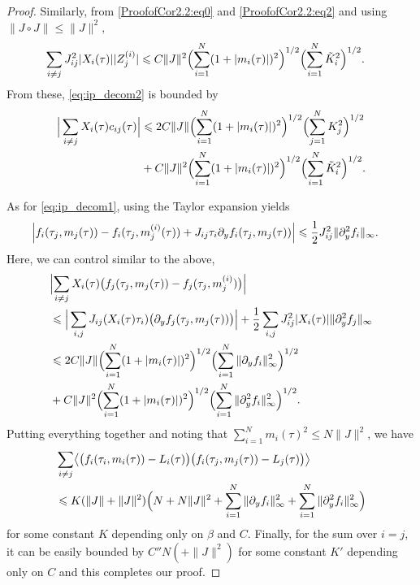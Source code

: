 \documentclass[letterpaper,11pt,reqno]{amsart}
\renewcommand{\le}{\leqslant}
\renewcommand{\leq}{\leqslant}
\newcommand{\ra}{\rangle}
\newcommand{\la}{\langle}
\newcommand{\mvgt}{{\tau}}
\begin{document}
\begin{proof}
Similarly, from \eqref{ProofofCor2.2:eq0} and \eqref{ProofofCor2.2:eq2} and using $\|J\circ J\|\leq \|J\|^2,$
\begin{align*}
     \sum_{i \ne j} J_{ij}^2|X_i(\tau)||Z_j^{(i)}|  
    &\leq C\|J\|^2\Bigl(\sum_{i=1}^N(1+|m_i(\tau)|)^2\Bigr)^{1/2}\Bigl(\sum_{i=1}^N\tilde K_i^2\Bigr)^{1/2}.
\end{align*}
From these, \eqref{eq:ip_decom2} is bounded by
\begin{align*}
  \Big| \sum_{i \ne j} X_i(\tau) c_{ij}(\tau) \Big |&\leq 2 C\|J\|\Bigl(\sum_{i=1}^N(1+|m_i(\tau)|)^2\Bigr)^{1/2}\Bigl(\sum_{j=1}^NK_j^2\Bigr)^{1/2}\\
&+C\|J\|^2\Bigl(\sum_{i=1}^N(1+|m_i(\tau)|)^2\Bigr)^{1/2}\Bigl(\sum_{i=1}^N\tilde K_i^2\Bigr)^{1/2}.
\end{align*}


As for \eqref{eq:ip_decom1}, using the Taylor expansion yields
\begin{align*}
    \Bigl|f_i(\tau_j,m_j(\mvgt))-f_i(\tau_j,m_j^{(i)}(\mvgt))+J_{ij}\tau_i\partial_yf_i(\tau_j, m_j(\mvgt))\Bigr|&\leq \frac{1}{2}J_{ij}^2\|\partial^2_{y}f_i\|_\infty.
\end{align*}
Here, we can control similar to the above,
\begin{align*}
   &\Bigl| \sum_{i\neq j}X_i(\tau)\bigl(f_j(\tau_j, m_j(\mvgt))-f_j(\tau_j,m_j^{(i)})\bigr)\Bigr| \\
   &\le \Big| \sum_{i, j} J_{ij} (X_i(\tau) \tau_i ) \big(\partial_yf_j(\tau_j,m_j(\mvgt)) \big) \Big|  + \frac12  \sum_{i, j} J_{ij}^2|X_i(\gt)|\|\partial^2_y f_j\|_{\infty}  \\
   &\leq 2C\|J\|\Bigl(\sum_{i=1}^N(1+|m_i(\tau)|)^2\Bigr)^{1/2}\Bigl(\sum_{i=1}^N\|\partial_yf_i\|_\infty^2\Bigr)^{1/2}\\
&+C\|J\|^2\Bigl(\sum_{i=1}^N(1+|m_i(\tau)|)^2\Bigr)^{1/2}\Bigl(\sum_{i=1}^N\|\partial_y^2f_i\|_\infty^2\Bigr)^{1/2}.
\end{align*}
Putting everything together and noting that $\sum_{i=1}^Nm_i(\tau)^2\leq N\|J\|^2$, we have
\begin{align*}
   &\sum_{i\neq j}\bigl\la \bigl(f_i(\tau_i, m_i(\mvgt) )-L_i(\mvgt)\bigr)\bigl(f_i(\tau_j, m_j(\mvgt) )-L_j(\mvgt)\bigr)\bigr\ra\\
   &\leq K(\|J\|+\|J\|^2)\Bigl(N+N\|J\|^2+\sum_{i=1}^N\|\partial_y f_i\|_\infty^2+\sum_{i=1}^N\|\partial_y^2f_i\|_\infty^2\Bigr)
\end{align*}
for some constant $K$ depending only on $\beta$ and $C.$ 
Finally, for the sum over $i=j$, it can be easily bounded by $C''N(+\|J\|^2)$ for some constant $K'$ depending only on $C$ and this completes our proof.


\end{proof}
\end{document}
